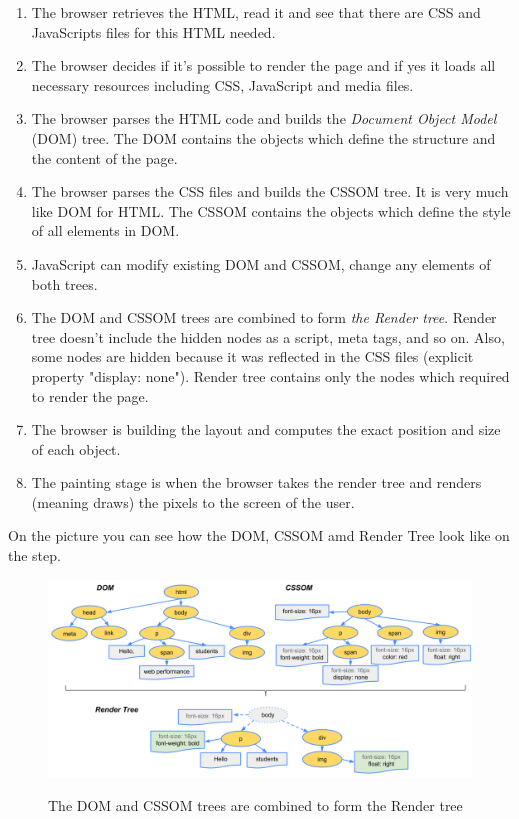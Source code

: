 \begin{enumerate}
    \item The browser retrieves the HTML, read it and see that there are CSS and JavaScripts files for this HTML needed.
    \item The browser decides if it's possible to render the page and if yes it loads all necessary resources including CSS, JavaScript and media files.
    \item The browser parses the HTML code and builds the \textit{Document Object Model} (DOM) tree. The DOM contains the objects which define the structure and the content of the page.
    \item The browser parses the CSS files and builds the CSSOM tree. It is very much like DOM for HTML. The CSSOM contains the objects which define the style of all elements in DOM.
    \item JavaScript can modify existing DOM and CSSOM, change any elements of both trees.
    \item The DOM and CSSOM trees are combined to form \textit{the Render tree}. Render tree doesn't include the hidden nodes as a script, meta tags, and so on. Also, some nodes are hidden because it was reflected in the CSS files (explicit property "display: none"). Render tree contains only the nodes which required to render the page.
    \item The browser is building the layout and computes the exact position and size of each object.
    \item The painting stage is when the browser takes the render tree and renders (meaning draws) the pixels to the screen of the user. 
\end{enumerate}

On the picture  you can see how the DOM, CSSOM amd Render Tree look like on the  step.\\

\begin{figure}[h]
\begin{center}
\includegraphics[width=1.0\textwidth]{figures02/render-tree-construction}
\caption{The DOM and CSSOM trees are combined to form the Render tree}
\label{fig:domcsstree}
\end{center}
\end{figure}

